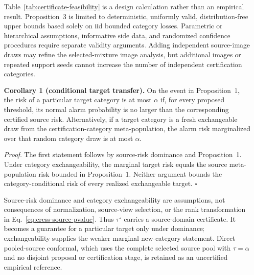 

Table~\ref{tab:certificate-feasibility} is a design calculation rather than an empirical result. Proposition~3 is limited to deterministic, uniformly valid, distribution-free upper bounds based solely on iid bounded category losses. Parametric or hierarchical assumptions, informative side data, and randomized confidence procedures require separate validity arguments. Adding independent source-image draws may refine the selected-mixture image analysis, but additional images or repeated support seeds cannot increase the number of independent certification categories.

\noindent\textbf{Corollary 1 (conditional target transfer).} On the event in Proposition~1, the risk of a particular target category is at most $\alpha$ if, for every proposed threshold, its normal alarm probability is no larger than the corresponding certified source risk. Alternatively, if a target category is a fresh exchangeable draw from the certification-category meta-population, the alarm risk marginalized over that random category draw is at most $\alpha$.

\noindent\emph{Proof.} The first statement follows by source-risk dominance and Proposition~1. Under category exchangeability, the marginal target risk equals the source meta-population risk bounded in Proposition~1. Neither argument bounds the category-conditional risk of every realized exchangeable target. \hfill$\square$

Source-risk dominance and category exchangeability are assumptions, not consequences of normalization, source-view selection, or the rank transformation in Eq.~\eqref{eq:cress-source-pvalue}. Thus $\tau^\star$ carries a source-domain certificate. It becomes a guarantee for a particular target only under dominance; exchangeability supplies the weaker marginal new-category statement. Direct pooled-source conformal, which uses the complete selected source pool with $\tau=\alpha$ and no disjoint proposal or certification stage, is retained as an uncertified empirical reference.
